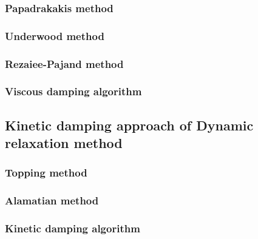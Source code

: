 \documentclass[preprint,3p,12pt]{elsarticle}
\begin{document}
\subsubsection{Papadrakakis method}
\subsubsection{Underwood method}
\subsubsection{Rezaiee-Pajand method}
\subsubsection{Viscous damping algorithm} 

\subsection{Kinetic damping approach of Dynamic relaxation method} \label{subsec:2:3}

\subsubsection{Topping method}

\subsubsection{Alamatian method}

\subsubsection{Kinetic damping algorithm}

\end{document}
